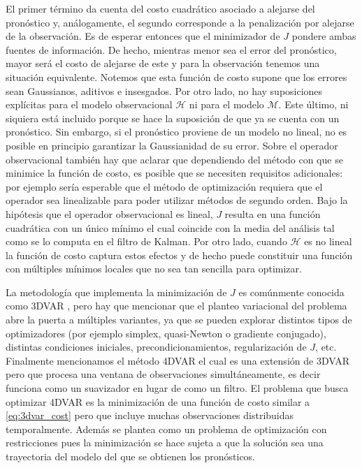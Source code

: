 El primer término da cuenta del costo cuadrático asociado a alejarse del pronóstico y, análogamente, el segundo corresponde a la penalización por alejarse de la observación. Es de esperar entonces que el minimizador de $J$ pondere ambas fuentes de información. De hecho, mientras menor sea el error del pronóstico, mayor será el costo de alejarse de este y para la observación tenemos una situación equivalente. Notemos que esta función de costo supone que los errores sean Gaussianos, aditivos e insesgados. Por otro lado, no hay suposiciones explícitas para el modelo observacional $\mathcal{H}$ ni para el modelo $\mathcal{M}$. Este último, ni siquiera está incluido porque se hace la suposición de que ya se cuenta con un pronóstico. Sin embargo, si el pronóstico proviene de un modelo no lineal, no es posible en principio garantizar la Gaussianidad de su error. Sobre el operador observacional también hay que aclarar que dependiendo del método con que se minimice la función de costo, es posible que se necesiten requisitos adicionales: por ejemplo sería esperable que el método de optimización requiera que el operador sea linealizable para poder utilizar métodos de segundo orden. Bajo la hipótesis que el operador observacional es lineal, $J$ resulta en una función cuadrática con un único mínimo el cual coincide con la media del análisis tal como se lo computa en el filtro de Kalman. Por otro lado, cuando $\mathcal{H}$ es no lineal la función de costo captura estos efectos y de hecho puede constituir una función con múltiples mínimos locales que no sea tan sencilla para optimizar.

La metodología que implementa la minimización de $J$ es comúnmente conocida como 3DVAR \citep{Courtier1998}, pero hay que mencionar que el planteo variacional del problema abre la puerta a múltiples variantes, ya que se pueden explorar distintos tipos de optimizadores (por ejemplo simplex, quasi-Newton o gradiente conjugado), distintas condiciones iniciales, precondicionamientos, regularización de $J$, etc. Finalmente mencionamos el método 4DVAR \citep{Talagrand1987, Rabier2003} el cual es una extensión de 3DVAR pero que procesa una ventana de observaciones simultáneamente, es decir funciona como un suavizador en lugar de como un filtro. El problema que busca optimizar 4DVAR es la minimización de una función de costo similar a \ref{eq:3dvar_cost} pero que incluye muchas observaciones distribuidas temporalmente. Además se plantea como un problema de optimización con restricciones pues la minimización se hace sujeta a que la solución sea una trayectoria del modelo del que se obtienen los pronósticos.


